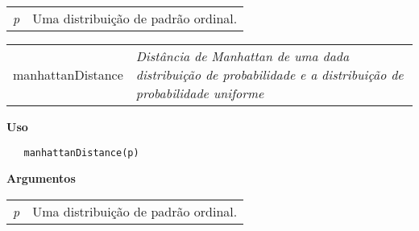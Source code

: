 \begin{table}[!ht]
\begin{center}
\begin{tabularx}{\textwidth}{X X}
\hspace{0.5cm} \textit{p} & Uma distribuição de padrão ordinal.\\
\end{tabularx}
\end{center}
\end{table} 

\newpage


\hrulefill   

\begin{table}[!ht]
\begin{center}
\begin{tabularx}{\textwidth}{ X X}
\hspace{0.5cm} manhattanDistance & \textit{Distância de Manhattan de uma dada distribuição de probabilidade e a distribuição de probabilidade uniforme}\\
\end{tabularx}
\end{center}
\end{table} 

\vspace{-0.5cm}

\hrulefill  

\vspace{0.5cm}

\textbf{Uso}

\begin{lstlisting}
   manhattanDistance(p)
\end{lstlisting}

\vspace{0.5cm}

\textbf{Argumentos}

\begin{table}[!ht]
\begin{center}
\begin{tabularx}{\textwidth}{X X}
\hspace{0.5cm} \textit{p} & Uma distribuição de padrão ordinal.\\
\end{tabularx}
\end{center}
\end{table} 

